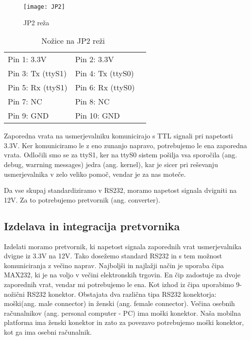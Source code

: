 \documentclass[a4paper, 12pt]{book}
\begin{document}
\begin{figure}[h]
	\centering
	\texttt{[image: JP2]}
	\caption{JP2 reža~\cite{bibJbproject}}
	\label{picJP2}
\end{figure}

\begin{table}[h]
	\centering
	\begin{tabular}{|l|l|l}
		\cline{1-2}
		Pin 1: 3.3V & Pin 2: 3.3V  \\ \cline{1-2}
		Pin 3: Tx (ttyS1) & Pin 4: Tx (ttyS0) \\ \cline{1-2}
		Pin 5: Rx (ttyS1) & Pin 6: Rx (ttyS0) \\ \cline{1-2}
		Pin 7: NC & Pin 8: NC \\ \cline{1-2}
		Pin 9: GND & Pin 10: GND \\ \cline{1-2}
	\end{tabular}
	\caption{Nožice na JP2 reži~\cite{bibJbproject}}
	\label{tabJP2}
\end{table}

Zaporedna vrata na usmerjevalniku komunicirajo s TTL signali pri na\-pe\-to\-sti 3.3V. Ker komuniciramo le z eno zunanjo napravo, potrebujemo le ena zaporedna vrata. Odločili smo se za ttyS1, ker na ttyS0 sistem pošilja vsa sporočila (ang. debug, warrning messages) jedra (ang. kernel), kar je sicer pri reševanju usmerjevalnika v zelo veliko pomoč, vendar je za nas moteče. 

Da vse skupaj standardiziramo v RS232, moramo napetost signala dvigniti na 12V. Za to potrebujemo pretvornik (ang. converter).

\subsection{Izdelava in integracija pretvornika}
Izdelati moramo pretvornik, ki napetost signala zaporednih vrat usmerjevalnika dvigne iz 3.3V na 12V. Tako dosežemo standard RS232 in s tem možnost komuniciranja z večino naprav. Najboljši in najlažji način je uporaba čipa MAX232, ki je na voljo v večini elektronskih trgovin. En čip zadostuje za dvoje zaporednih vrat, vendar mi potrebujemo le ena. Kot izhod iz čipa uporabimo 9-nožični RS232 konektor. Obstajata dva različna tipa RS232 konektorja: moški(ang. male connector) in ženski (ang. female connector). Večina osebnih računalnikov (ang. personal computer - PC) ima moški konektor. Naša mobilna platforma ima ženski konektor in zato za povezavo potrebujemo moški konektor, kot ga ima osebni računalnik. 
\end{document}
